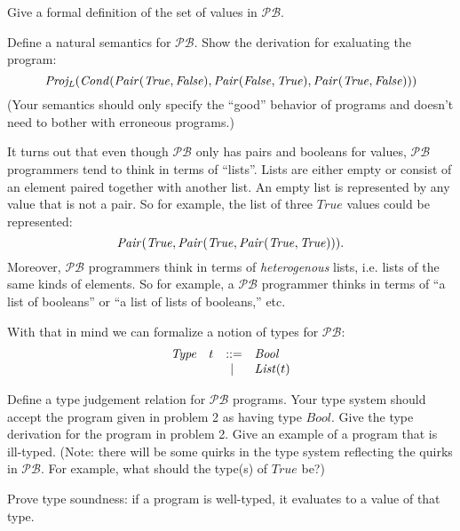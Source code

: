 \documentclass[11pt]{article}
\newcommand\Bool{\mathit{Bool}}
\newcommand\True{\mathit{True}}
\newcommand\False{\mathit{False}}
\newcommand\Plang{\mathcal{PB}}
\begin{document}
\newpage
\begin{exercise}
Give a formal definition of the set of values in $\Plang$.
\end{exercise}
\vspace{1.2in}

\begin{exercise}
Define a natural semantics for $\Plang$. Show the derivation for
exaluating the program:
\[
\ProjL(\Cond(\Cons(\True,\False),\Cons(\False,\True),\Cons(\True,\False)))
\]
%
(Your semantics should only specify the ``good'' behavior of programs
and doesn't need to bother with erroneous programs.)
\end{exercise}

\newpage
It turns out that even though $\Plang$ only has pairs and booleans for
values, $\Plang$ programmers tend to think in terms of ``lists''.
Lists are either empty or consist of an element paired together with
another list.  An empty list is represented by any value that is not a
pair.  So for example, the list of three $\True$ values could be
represented:
\[
\Cons(\True,\Cons(\True,\Cons(\True,\True)))\text.
\]
%
Moreover, $\Plang$ programmers think in terms of \emph{heterogenous}
lists, i.e. lists of the same kinds of elements.  So for example, a
$\Plang$ programmer thinks in terms of ``a list of booleans'' or ``a
list of lists of booleans,'' etc.

With that in mind we can formalize a notion of types for $\Plang$:
\[
\begin{array}{lrcll}
 \mathit{Type} 
               & t & ::= & \Bool\\
               &   &  |\ & \List(t)
\end{array}
\]

\vspace{.5in}

\begin{exercise}
Define a type judgement relation for $\Plang$ programs.  Your type
system should accept the program given in problem 2 as having type
$\Bool$.  Give the type derivation for the program in problem 2.  Give
an example of a program that is ill-typed.  (Note: there will be some
quirks in the type system reflecting the quirks in $\Plang$.  For
example, what should the type(s) of $\True$ be?)
\end{exercise}


\newpage
\begin{exercise}
Prove type soundness: if a program is well-typed, it evaluates to a
value of that type.
\end{exercise}
\end{document}
